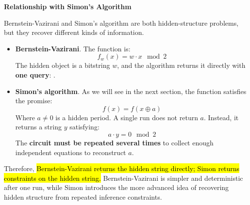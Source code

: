 \highspace
\begin{flushleft}
    \textcolor{Green3}{ \textbf{Relationship with Simon's Algorithm}}
\end{flushleft}
Bernstein-Vazirani and Simon's algorithm are both hidden-structure problems, but they recover different kinds of information.
\begin{itemize}
    \item \textbf{Bernstein-Vazirani}. The function is:
    \begin{equation*}
        f_w(x) = w \cdot x \mod 2
    \end{equation*}
    The hidden object is a bitstring $w$, and the algorithm returns it directly with \textbf{one query}: .


    \item \textbf{Simon's algorithm}. As we will see in the next section, the function satisfies the promise:
    \begin{equation*}
        f(x) = f(x \oplus a)
    \end{equation*}
    Where $a \neq 0$ is a hidden period. A single run does not return $a$. Instead, it returns a string $y$ satisfying:
    \begin{equation*}
        a \cdot y = 0 \mod 2
    \end{equation*}
    The \textbf{circuit must be repeated several times} to collect enough independent equations to reconstruct $a$.
\end{itemize}
Therefore, \hl{Bernstein-Vazirani returns the hidden string directly; Simon returns constraints on the hidden string.} Bernstein-Vazirani is simpler and deterministic after one run, while Simon introduces the more advanced idea of recovering hidden structure from repeated inference constraints.


